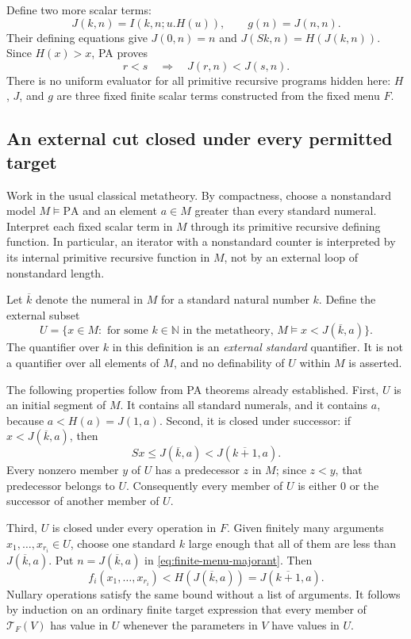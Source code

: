Define two more scalar terms:
\[
 J(k,n)=I(k,n;u.H(u)),\qquad
 g(n)=J(n,n).
\]
Their defining equations give
$J(0,n)=n$ and $J(Sk,n)=H(J(k,n))$.  Since $H(x)>x$, PA proves
\begin{equation}
 r<s\quad\Longrightarrow\quad J(r,n)<J(s,n).
 \label{eq:finite-menu-orbit}
\end{equation}
There is no uniform evaluator for all primitive recursive programs hidden
here: $H$, $J$, and $g$ are three fixed finite scalar terms constructed from
the fixed menu $F$.

\subsection{An external cut closed under every permitted target}

Work in the usual classical metatheory.  By compactness, choose a
nonstandard model $M\models\mathrm{PA}$ and an element $a\in M$ greater
than every standard numeral.  Interpret each fixed scalar term in $M$
through its primitive recursive defining function.  In particular, an
iterator with a nonstandard counter is interpreted by its internal
primitive recursive function in $M$, not by an external loop of
nonstandard length.

Let $\overline{k}$ denote the numeral in $M$ for a standard natural number
$k$.  Define the external subset
\begin{equation}
 U=\{x\in M:\text{ for some }k\in\mathbb N\text{ in the metatheory, }
                      M\models x<J(\overline{k},a)\}.
 \label{eq:finite-menu-cut}
\end{equation}
The quantifier over $k$ in this definition is an \emph{external standard}
quantifier.  It is not a quantifier over all elements of $M$, and no
definability of $U$ within $M$ is asserted.

The following properties follow from PA theorems already established.
First, $U$ is an initial segment of $M$.  It contains all standard numerals,
and it contains $a$, because $a<H(a)=J(1,a)$.  Second, it is closed under
successor: if $x<J(\overline{k},a)$, then
\[
 Sx\le J(\overline{k},a)
      <J(\overline{k+1},a).
\]
Every nonzero member $y$ of $U$ has a predecessor $z$ in $M$; since $z<y$,
that predecessor belongs to $U$.  Consequently every member of $U$ is
either $0$ or the successor of another member of $U$.

Third, $U$ is closed under every operation in $F$.  Given finitely many
arguments $x_1,\ldots,x_{r_i}\in U$, choose one standard $k$ large enough
that all of them are less than $J(\overline{k},a)$.  Put
$n=J(\overline{k},a)$ in \eqref{eq:finite-menu-majorant}.  Then
\[
 f_i(x_1,\ldots,x_{r_i})<H(J(\overline{k},a))
                       =J(\overline{k+1},a).
\]
Nullary operations satisfy the same bound without a list of arguments.
It follows by induction on an ordinary finite target expression that
every member of $\mathcal T_F(V)$ has value in $U$ whenever the parameters
in $V$ have values in $U$.


